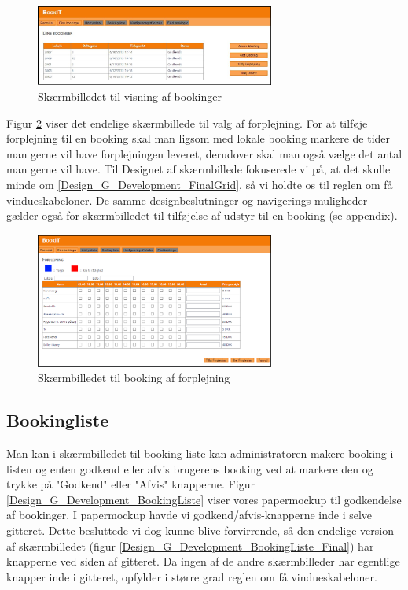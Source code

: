 \begin{figure}[h!]
  \centering
    \includegraphics[width=0.7\textwidth]{Appendix/GUI-Prototype/DigitalMockup/DineBookinger}
  \caption{Skærmbilledet til visning af bookinger}
\label{Design_G_Development_YourBookings_Final}
\end{figure} 

Figur \ref{Design_G_Development_Forplejning_Final} viser det endelige skærmbillede til valg af forplejning. For at tilføje forplejning til en booking skal man ligsom med lokale booking markere de tider man gerne vil have forplejningen leveret, derudover skal man også vælge det antal man gerne vil have.
Til Designet af  skærmbillede fokuserede vi på, at det skulle minde om \ref{Design_G_Development_FinalGrid}, så vi holdte os til reglen om få vindueskabeloner. De samme designbeslutninger og navigerings muligheder gælder også for skærmbilledet til tilføjelse af udstyr til en booking (se appendix).

\begin{figure}[h!]
  \centering
    \includegraphics[width=0.7\textwidth]{Appendix/GUI-Prototype/DigitalMockup/Forplejning}
  \caption{Skærmbilledet til booking af forplejning}
\label{Design_G_Development_Forplejning_Final}
\end{figure} 

\subsection{Bookingliste}
Man kan i skærmbilledet til booking liste kan administratoren makere booking i listen og enten godkend eller afvis brugerens booking ved at markere den og trykke på "Godkend" eller "Afvis" knapperne.
Figur \ref{Design_G_Development_BookingListe} viser vores papermockup til godkendelse af bookinger. 
I papermockup havde vi godkend/afvis-knapperne inde i selve gitteret. Dette besluttede vi dog kunne blive forvirrende, så den endelige version af skærmbilledet (figur \ref{Design_G_Development_BookingListe_Final}) har knapperne ved siden af gitteret. Da ingen af de andre skærmbilleder har egentlige knapper inde i gitteret, opfylder i større grad reglen om få vindueskabeloner.

